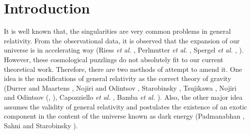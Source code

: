 \documentclass[11pt]{article}
\theoremstyle{theorem}
\theoremstyle{defi}
\begin{document}
\section{Introduction}It is well known that, the singularities are very common problems in general relativity. From the observational data, it is observed that the expansion of our universe is in accelerating way
(Riess \emph{et al.} \cite{1}, Perlmutter \emph{et al.} \cite{2}, Spergel \emph{et al.} \cite{3}, \cite{4}). However, these cosmological puzzlings do not absolutely fit to our current theoretical work.
Therefore, there are two methods of attempt to amend it. One idea is the modifications of general relativity as the correct theory
of gravity (Durrer and Maartens \cite{5}, Nojiri and Odintsov \cite{6}, Starobinsky \cite{7}, Tsujikawa \cite{8}, Nojiri and Odintsov (\cite{9}, \cite{10}), Capozziello \emph{et al.} \cite{11}, Bamba \emph{et al.} \cite{12}). Also, the other major idea assumes the validity of general relativity and postulates the existence of an exotic component in the content of the universe known as dark energy (Padmanabhan \cite{13}, Sahni and Starobinsky \cite{14}).
\end{document}
